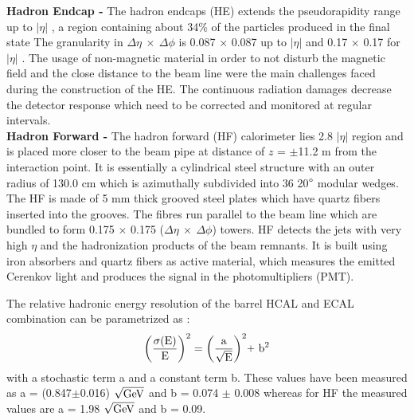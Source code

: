 {\bf Hadron Endcap -} The hadron endcaps (HE) extends the pseudorapidity range up to $|\eta|$ , a region containing about 34\% of the particles produced in the final state The granularity in $\Delta\eta~\times~\Delta\phi$ is 0.087 $\times$ 0.087 up to $|\eta|$  and 0.17 $\times$ 0.17 for $|\eta|$ . The usage of non-magnetic material in order to not disturb the magnetic field and the close distance to the beam line were the main challenges faced during the construction of the HE. The continuous radiation damages decrease the detector response which need to be corrected and monitored at regular intervals. \\ \newline
{\bf Hadron Forward -} The hadron forward (HF) calorimeter lies 2.8 \ls $|\eta|$  region and is placed more closer to the beam pipe at distance of $z$ = $\pm$11.2 m from the interaction point. It is essentially a cylindrical steel structure with an outer radius of 130.0 cm which is azimuthally subdivided into 36 20$\degree$ modular wedges. The HF is made of 5 mm thick grooved steel plates which have quartz fibers inserted into the grooves. The fibres run parallel to the beam line which are bundled to form 0.175 $\times$ 0.175 ($\Delta\eta~\times~\Delta\phi$) towers. HF detects the jets with very high $\eta$ and the hadronization products of the beam remnants. It is built using iron absorbers and quartz fibers as active material, which measures the emitted Cerenkov light and produces the signal in the photomultipliers (PMT).

The relative hadronic energy resolution of the barrel HCAL and ECAL combination can be parametrized as :
\begin{equation}
{\rm \bigg(\frac{\sigma(E)}{E}\bigg)^2 = \bigg(\frac{a}{\sqrt{E}}\bigg)^2 \plus b^2}
\end{equation}
with a stochastic term a and a constant term b. These values have been measured \cite{Chatrchyan:2009ag} as a = (0.847$\pm$0.016) $\sqrt{\rm GeV}$ and b = 0.074 $\pm$ 0.008 whereas for HF the measured values are a = 1.98 $\sqrt{\rm GeV}$ and b = 0.09.

